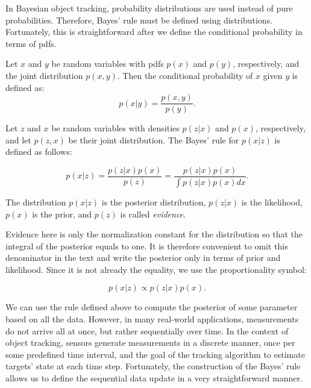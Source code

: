 In Bayesian object tracking, probability distributions are used instead of pure 
probabilities. Therefore, Bayes' rule must be defined using distributions. 
Fortunately, this is straightforward after we define the conditional probability in terms of pdfs.

\begin{definition}\label{def:cond-prob-pdf}
    Let $x$ and $y$ be random variables with pdfs $p(x)$ and $p(y)$, respectively, and the joint distribution $p(x,y)$. Then the conditional probability of $x$ given $y$ is defined as:
    \begin{equation}
        p(x|y) = \frac{p(x,y)}{p(y)}.
    \end{equation}
\end{definition}

\begin{definition}
    Let $z$ and $x$ be random variables with densities $p(z | x)$ and $p(x)$, 
    respectively, and let $p(z, x)$ be their joint distribution. The Bayes' rule
    for 
    $p(x | z)$ is defined as follows:

    \begin{equation}
    p(x | z)
        = \frac{p(z | x) p(x)}{p(z)}
        = \frac{p(z | x) p(x)}{\int p(z | x) p(x) dx}.
    \end{equation}
\end{definition}

The distribution $p(x | z)$ is the posterior distribution, $p(z | x)$ is the 
likelihood, $p(x)$ is the prior, and $p(z)$ is called \textit{evidence}.

Evidence here is only the normalization constant for the distribution so
that the integral of the posterior equals to one. It is therefore convenient
to omit this denominator in the text and write the posterior only in terms of
prior and likelihood. Since it is not already the equality, we use the
proportionality symbol:

\begin{equation}
p(x | z) \propto p(z | x) p(x).
\end{equation}

We can use the rule defined above to compute the posterior of some parameter
based on all the data. However, in many real-world applications, measurements
do not arrive all at once, but rather sequentially over time. In the context of 
object tracking, sensors generate measurements in a discrete manner, once per
some predefined time interval, and the goal of the tracking algorithm to 
estimate targets' state at each time step. Fortunately, the construction of the
Bayes' rule allows us to define the sequential data update in a very 
straightforward manner.

